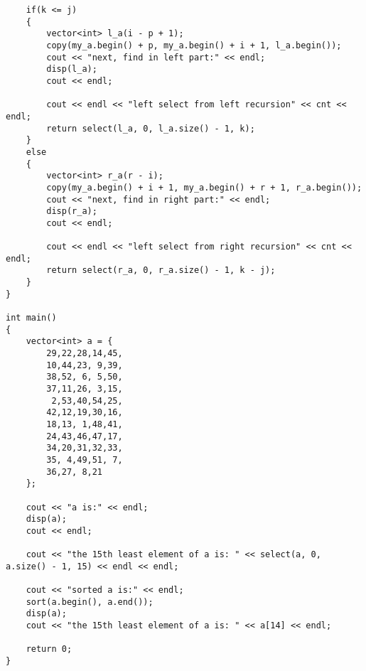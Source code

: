 \documentclass{article}
\begin{document}
\begin{CJK*}{UTF8}{gbsn}
\begin{lstlisting}
	if(k <= j)
	{
		vector<int> l_a(i - p + 1);
		copy(my_a.begin() + p, my_a.begin() + i + 1, l_a.begin());
		cout << "next, find in left part:" << endl;
		disp(l_a);
		cout << endl;

		cout << endl << "left select from left recursion" << cnt << endl;
		return select(l_a, 0, l_a.size() - 1, k);
	}
	else
	{
		vector<int> r_a(r - i);
		copy(my_a.begin() + i + 1, my_a.begin() + r + 1, r_a.begin());
		cout << "next, find in right part:" << endl;
		disp(r_a);
		cout << endl;

		cout << endl << "left select from right recursion" << cnt << endl;
		return select(r_a, 0, r_a.size() - 1, k - j);
	}
}

int main()
{
	vector<int> a = {
		29,22,28,14,45,
		10,44,23, 9,39,
		38,52, 6, 5,50,
		37,11,26, 3,15,
		 2,53,40,54,25,
		42,12,19,30,16,
		18,13, 1,48,41,
		24,43,46,47,17,
		34,20,31,32,33,
		35, 4,49,51, 7,
		36,27, 8,21
	};

	cout << "a is:" << endl;
	disp(a);
	cout << endl;

	cout << "the 15th least element of a is: " << select(a, 0, a.size() - 1, 15) << endl << endl;

	cout << "sorted a is:" << endl;
	sort(a.begin(), a.end());
	disp(a);
	cout << "the 15th least element of a is: " << a[14] << endl;

	return 0;
}
\end{lstlisting}




\end{CJK*}
\end{document}
